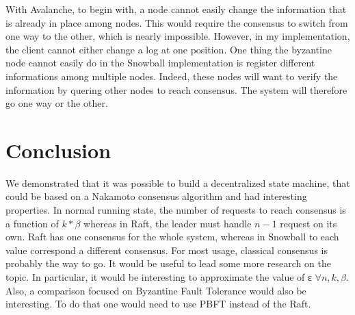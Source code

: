 \documentclass[11pt, twocolumn]{article}
\begin{document}
With Avalanche, to begin with, a node cannot easily change the information that is already in place among nodes. This would require the consensus to switch from one way to the other, which is nearly impossible. However, in my implementation, the client cannot either change a log at one position.
One thing the byzantine node cannot easily do in the Snowball implementation is register different informations among multiple nodes. Indeed, these nodes will want to verify the information by quering other nodes to reach consensus. The system will therefore go one way or the other.

\section{Conclusion}

We demonstrated that it was possible to build a decentralized state machine, that could be based on a Nakamoto consensus algorithm and had interesting properties. 
In normal running state, the number of requests to reach consensus is a function of $k * \beta$ whereas in Raft, the leader must handle $n-1$ request on its own. 
Raft has one consensus for the whole system, whereas in Snowball to each value correspond a different consensus. For most usage, classical consensus is probably the way to go.
It would be useful to lead some more research on the topic. 
In particular, it would be interesting to approximate the value of ε $\forall n, k, \beta$. 
Also, a comparison focused on Byzantine Fault Tolerance would also be interesting. To do that one would need to use PBFT \cite{pbft} instead of the Raft.

\onecolumn
\end{document}

